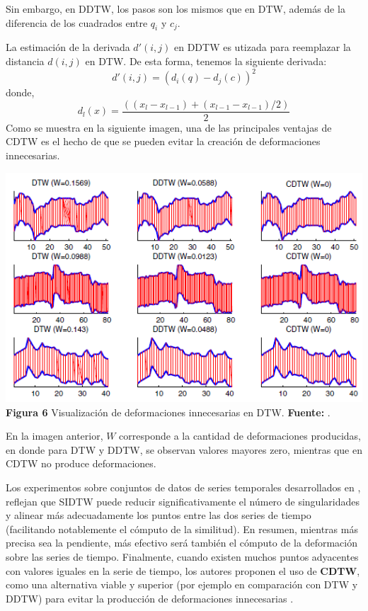 Sin embargo, en DDTW, los pasos son los mismos que en DTW, adem\'as de la diferencia de los cuadrados entre $q_i$ y $c_j$.\par
La estimaci\'on de la derivada $d'(i,j)$ en DDTW es utizada para reemplazar la distancia $d(i,j)$ en DTW. De esta forma, tenemos la siguiente derivada:
\begin{equation}
d'(i,j) = (d_i(q) - d_j(c))^2
\end{equation}
donde, 
\begin{equation}
d_l(x) = \frac{((x_l - x_{l-1}) + (x_{l-1} - x_{l-1})/2)}{2}
\end{equation}
Como se muestra en la siguiente imagen, una de las principales ventajas de CDTW es el hecho de que se pueden evitar la creaci\'on de deformaciones innecesarias.
\begin{center}
\includegraphics[scale=0.8]{cdtw.png}\\
\vspace*{10pt}
\footnotesize{\textbf{Figura 6} Visualizaci\'on de deformaciones innecesarias en DTW.} \textbf{Fuente:} \cite{DTWcubicsplineinterpolation}.
\end{center}
En la imagen anterior, $W$ corresponde a la cantidad de deformaciones producidas, en donde para DTW y DDTW, se observan valores mayores zero, mientras que en CDTW no produce deformaciones.\par
Los experimentos sobre conjuntos de datos de series temporales desarrollados en \cite{DTWcubicsplineinterpolation}, reflejan que SIDTW puede reducir significativamente el n\'umero de singularidades y alinear m\'as adecuadamente los puntos entre las dos series de tiempo (facilitando notablemente el c\'omputo de la similitud). En resumen, mientras m\'as precisa sea la pendiente, m\'as efectivo ser\'a tambi\'en el c\'omputo de la deformaci\'on sobre las series de tiempo. Finalmente, cuando existen muchos puntos adyacentes con valores iguales en la serie de tiempo, los autores proponen el uso de \textbf{CDTW}, como una alternativa viable y superior (por ejemplo en comparaci\'on con DTW y DDTW) para evitar la producci\'on de deformaciones innecesarias 	\cite{DTWcubicsplineinterpolation}.
